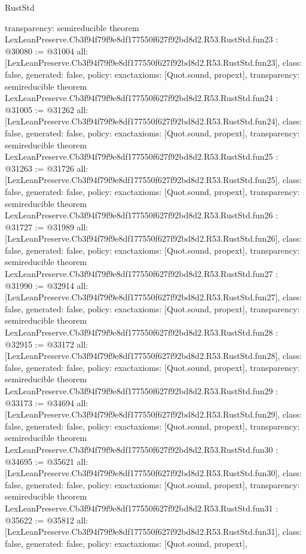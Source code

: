 \begin{lexlean}{RustStd}
\begin{coremodule}
{  transparency: semireducible
}
theorem LexLeanPreserve.Cb3f94f79f9e8df177550f627f92bd8d2.R53.RustStd.fun23 : @30080 := @31004 {
  all: [LexLeanPreserve.Cb3f94f79f9e8df177550f627f92bd8d2.R53.RustStd.fun23],
  class: false,
  generated: false,
  policy: exact{axioms: [Quot.sound, propext]},
  transparency: semireducible
}
theorem LexLeanPreserve.Cb3f94f79f9e8df177550f627f92bd8d2.R53.RustStd.fun24 : @31005 := @31262 {
  all: [LexLeanPreserve.Cb3f94f79f9e8df177550f627f92bd8d2.R53.RustStd.fun24],
  class: false,
  generated: false,
  policy: exact{axioms: [Quot.sound, propext]},
  transparency: semireducible
}
theorem LexLeanPreserve.Cb3f94f79f9e8df177550f627f92bd8d2.R53.RustStd.fun25 : @31263 := @31726 {
  all: [LexLeanPreserve.Cb3f94f79f9e8df177550f627f92bd8d2.R53.RustStd.fun25],
  class: false,
  generated: false,
  policy: exact{axioms: [Quot.sound, propext]},
  transparency: semireducible
}
theorem LexLeanPreserve.Cb3f94f79f9e8df177550f627f92bd8d2.R53.RustStd.fun26 : @31727 := @31989 {
  all: [LexLeanPreserve.Cb3f94f79f9e8df177550f627f92bd8d2.R53.RustStd.fun26],
  class: false,
  generated: false,
  policy: exact{axioms: [Quot.sound, propext]},
  transparency: semireducible
}
theorem LexLeanPreserve.Cb3f94f79f9e8df177550f627f92bd8d2.R53.RustStd.fun27 : @31990 := @32914 {
  all: [LexLeanPreserve.Cb3f94f79f9e8df177550f627f92bd8d2.R53.RustStd.fun27],
  class: false,
  generated: false,
  policy: exact{axioms: [Quot.sound, propext]},
  transparency: semireducible
}
theorem LexLeanPreserve.Cb3f94f79f9e8df177550f627f92bd8d2.R53.RustStd.fun28 : @32915 := @33172 {
  all: [LexLeanPreserve.Cb3f94f79f9e8df177550f627f92bd8d2.R53.RustStd.fun28],
  class: false,
  generated: false,
  policy: exact{axioms: [Quot.sound, propext]},
  transparency: semireducible
}
theorem LexLeanPreserve.Cb3f94f79f9e8df177550f627f92bd8d2.R53.RustStd.fun29 : @33173 := @34694 {
  all: [LexLeanPreserve.Cb3f94f79f9e8df177550f627f92bd8d2.R53.RustStd.fun29],
  class: false,
  generated: false,
  policy: exact{axioms: [Quot.sound, propext]},
  transparency: semireducible
}
theorem LexLeanPreserve.Cb3f94f79f9e8df177550f627f92bd8d2.R53.RustStd.fun30 : @34695 := @35621 {
  all: [LexLeanPreserve.Cb3f94f79f9e8df177550f627f92bd8d2.R53.RustStd.fun30],
  class: false,
  generated: false,
  policy: exact{axioms: [Quot.sound, propext]},
  transparency: semireducible
}
theorem LexLeanPreserve.Cb3f94f79f9e8df177550f627f92bd8d2.R53.RustStd.fun31 : @35622 := @35812 {
  all: [LexLeanPreserve.Cb3f94f79f9e8df177550f627f92bd8d2.R53.RustStd.fun31],
  class: false,
  generated: false,
  policy: exact{axioms: [Quot.sound, propext]},
}
\end{coremodule}
\end{lexlean}
